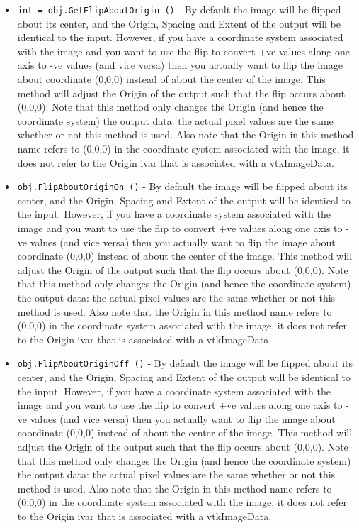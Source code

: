 \begin{itemize}
\item  \verb|int = obj.GetFlipAboutOrigin ()| -  By default the image will be flipped about its center, and the
 Origin, Spacing and Extent of the output will be identical to
 the input.  However, if you have a coordinate system associated
 with the image and you want to use the flip to convert +ve values
 along one axis to -ve values (and vice versa) then you actually
 want to flip the image about coordinate (0,0,0) instead of about
 the center of the image.  This method will adjust the Origin of
 the output such that the flip occurs about (0,0,0).  Note that
 this method only changes the Origin (and hence the coordinate system)
 the output data: the actual pixel values are the same whether or not
 this method is used.  Also note that the Origin in this method name
 refers to (0,0,0) in the coordinate system associated with the image,
 it does not refer to the Origin ivar that is associated with a
 vtkImageData.

\item  \verb|obj.FlipAboutOriginOn ()| -  By default the image will be flipped about its center, and the
 Origin, Spacing and Extent of the output will be identical to
 the input.  However, if you have a coordinate system associated
 with the image and you want to use the flip to convert +ve values
 along one axis to -ve values (and vice versa) then you actually
 want to flip the image about coordinate (0,0,0) instead of about
 the center of the image.  This method will adjust the Origin of
 the output such that the flip occurs about (0,0,0).  Note that
 this method only changes the Origin (and hence the coordinate system)
 the output data: the actual pixel values are the same whether or not
 this method is used.  Also note that the Origin in this method name
 refers to (0,0,0) in the coordinate system associated with the image,
 it does not refer to the Origin ivar that is associated with a
 vtkImageData.

\item  \verb|obj.FlipAboutOriginOff ()| -  By default the image will be flipped about its center, and the
 Origin, Spacing and Extent of the output will be identical to
 the input.  However, if you have a coordinate system associated
 with the image and you want to use the flip to convert +ve values
 along one axis to -ve values (and vice versa) then you actually
 want to flip the image about coordinate (0,0,0) instead of about
 the center of the image.  This method will adjust the Origin of
 the output such that the flip occurs about (0,0,0).  Note that
 this method only changes the Origin (and hence the coordinate system)
 the output data: the actual pixel values are the same whether or not
 this method is used.  Also note that the Origin in this method name
 refers to (0,0,0) in the coordinate system associated with the image,
 it does not refer to the Origin ivar that is associated with a
 vtkImageData.


\end{itemize}
